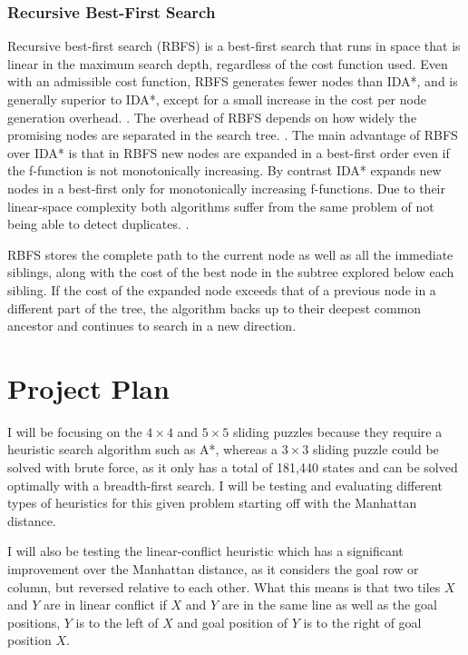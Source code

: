 \documentclass[review]{cmpreport}
\begin{document}
\subsubsection{Recursive Best-First Search}
Recursive best-first search (RBFS) is a best-first search that runs in space that is linear in the maximum search depth, regardless of the cost function used. Even with an admissible cost function, RBFS generates fewer nodes than IDA*, and is generally superior to IDA*, except for a small increase in the cost per node generation overhead. \citep{DBLP:journals/mima/Korf95}. The overhead of RBFS depends on how widely the promising nodes are separated in the search tree. \citep{Hatem:2015:RBS:2887007.2887167}.
The main advantage of RBFS over IDA* is that in RBFS new nodes are expanded in a best-first order even if the f-function is not monotonically increasing. By contrast IDA* expands new nodes in a best-first only for monotonically increasing f-functions. Due to their linear-space complexity both algorithms suffer from the same problem of not being able to detect duplicates. \citep{DBLP:conf/socs/Felner15}. 


RBFS stores the complete path to the current node as well as all the immediate siblings, along with the cost of the best node in the subtree explored below each sibling. If the cost of the expanded node exceeds that of a previous node in a different part of the tree, the algorithm backs up to their deepest common ancestor and continues to search in a new direction. 

\section{Project Plan}
I will be focusing on the $4\times4$ and $5\times5$ sliding puzzles because they require a heuristic search algorithm such as A*, whereas a $3\times3$ sliding puzzle could be solved with brute force, as it only has a total of 181,440 states and can be solved optimally with a breadth-first search. I will be testing and evaluating different types of heuristics for this given problem starting off with the Manhattan distance. 

I will also be testing the linear-conflict heuristic which has a significant improvement over the Manhattan distance, as it considers the goal row or column, but reversed relative to each other. What this means is that two tiles $X$ and $Y$ are in linear conflict if $X$ and $Y$ are in the same line as well as the goal positions, $Y$ is to the left of $X$ and goal position of $Y$ is to the right of goal position $X$.
\end{document}
